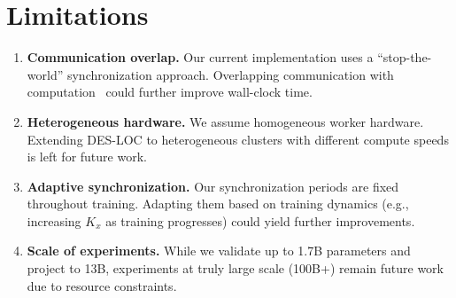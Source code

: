 \documentclass{article}
\begin{document}
\section{Limitations}
\label{sec:limitations}

\begin{enumerate}
\item \textbf{Communication overlap.} Our current implementation uses a ``stop-the-world'' synchronization approach. Overlapping communication with computation~\citep{douillard2025streaming} could further improve wall-clock time.

\item \textbf{Heterogeneous hardware.} We assume homogeneous worker hardware. Extending DES-LOC to heterogeneous clusters with different compute speeds is left for future work.

\item \textbf{Adaptive synchronization.} Our synchronization periods are fixed throughout training. Adapting them based on training dynamics (e.g., increasing $K_x$ as training progresses) could yield further improvements.

\item \textbf{Scale of experiments.} While we validate up to 1.7B parameters and project to 13B, experiments at truly large scale (100B+) remain future work due to resource constraints.
\end{enumerate}
\end{document}
